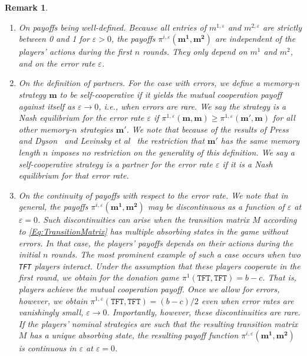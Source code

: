 \documentclass[9pt,twoside,lineno]{pnas-new}
\theoremstyle{plainCl1}
\theoremstyle{plainCl2}
\newtheorem{remark}{Remark}
\def\tft{\texttt{TFT}}
\begin{document}
\begin{remark} \label{Rem:Errors}
\begin{enumerate}[label=({\it \roman*})]

\item {\it On payoffs being well-defined.} Because all entries of $m^{1,\varepsilon}$ and $m^{2,\varepsilon}$ are strictly between 0 and 1 for $\varepsilon\!>\!0$, the payoffs $\pi^{i,\varepsilon}(\mathbf{m^1},\mathbf{m^2})$ are independent of the players' actions during the first $n$ rounds. They only depend on $m^{1}$ and $m^{2}$, and on the error rate $\varepsilon$. 

\item {\it On the definition of partners.} For the case with errors, we define a memory-$n$ strategy $\mathbf{m}$ to be self-cooperative if it yields the mutual cooperation payoff against itself as $\varepsilon\rightarrow 0$, i.e., when errors are rare. 
We say the strategy is a Nash equilibrium for the error rate $\varepsilon$ if $\pi^{1,\varepsilon}(\mathbf{m},\mathbf{m}) \ge \pi^{1,\varepsilon}(\mathbf{m'},\mathbf{m})$ for all other memory-$n$ strategies $\mathbf{m'}$. We note that because of the results of Press and Dyson~\citep{press:PNAS:2012} and Levinsky et al~\citep{Levinsky:IJGT:2020} the restriction that $\mathbf{m'}$ has the same memory length $n$ imposes no restriction on the generality of this definition. We say a self-cooperative strategy is a partner for the error rate $\varepsilon$ if it is a Nash equilibrium for that error rate. 

\item {\it On the continuity of payoffs with respect to the error rate.} 
We note that in general, the payoffs $\pi^{i,\varepsilon}(\mathbf{m^1},\mathbf{m^2})$ may be discontinuous as a function of $\varepsilon$ at $\varepsilon\!=\!0$. 
Such discontinuities can arise when the transition matrix $M$ according to \eqref{Eq:TransitionMatrix} has multiple absorbing states in the game without errors. 
In that case, the players' payoffs depends on their actions during the initial $n$ rounds. 
The most prominent example of such a case occurs when two \tft{} players interact. 
Under the assumption that these players cooperate in the first round, we obtain for the donation game $\pi^{1}(\tft,\tft{})\!=\!b\!-\!c$.
That is, players achieve the mutual cooperation payoff. 
Once we allow for errors, however, we obtain $\pi^{1,\varepsilon}(\tft,\tft)\!=\!(b\!-\!c)/2$ even when error rates are vanishingly small, $\varepsilon\!\rightarrow\!0$. 
Importantly, however, these discontinuities are rare. 
If the players' nominal strategies are such that the resulting transition matrix $M$ has a unique absorbing state, the resulting payoff function $\pi^{i,\varepsilon}(\mathbf{m^1},\mathbf{m^2})$ is continuous in $\varepsilon$ at $\varepsilon\!=\!0$. 


\end{enumerate}
\end{remark}
\end{document}
